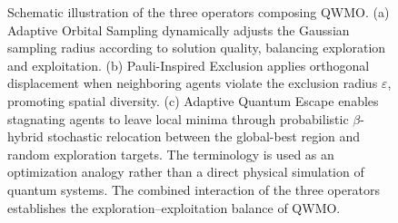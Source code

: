 \begin{figure}[t]
\begin{tikzpicture}
\end{tikzpicture}

\caption{
Schematic illustration of the three operators composing QWMO.
(a) Adaptive Orbital Sampling dynamically adjusts the Gaussian
sampling radius according to solution quality, balancing
exploration and exploitation.
(b) Pauli-Inspired Exclusion applies orthogonal displacement
when neighboring agents violate the exclusion radius
$\varepsilon$, promoting spatial diversity.
(c) Adaptive Quantum Escape enables stagnating agents
to leave local minima through probabilistic
$\beta$-hybrid stochastic relocation between
the global-best region and random exploration targets.
The terminology is used as an optimization analogy rather than
a direct physical simulation of quantum systems.
The combined interaction of the three operators establishes
the exploration--exploitation balance of QWMO.
}
\label{fig:qwmo_operators}

\end{figure}